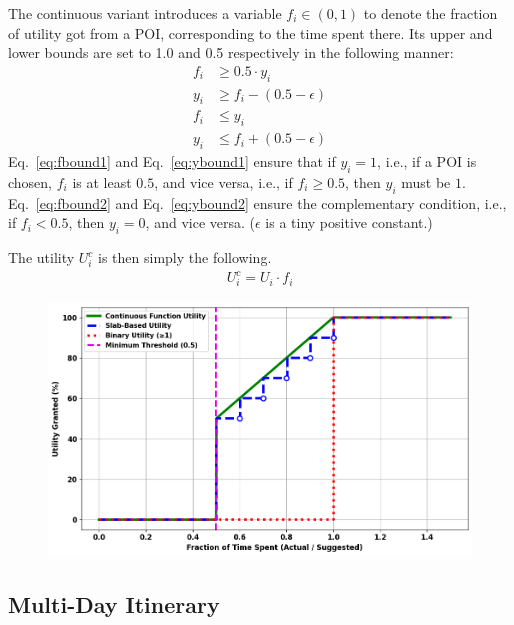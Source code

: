 The continuous variant introduces a variable $f_i \in (0,1)$ to denote the fraction of utility got from a POI, corresponding to the time spent there.
Its upper and lower bounds are set to 1.0 and 0.5 respectively in the following manner:
%
\begin{align}
	\label{eq:fbound1}
	f_i & \geq 0.5 \cdot y_i \\
	\label{eq:ybound1}
	y_i & \geq f_i - (0.5 - \epsilon) \\
    \label{eq:fbound2}
	f_i & \leq y_i \\
	\label{eq:ybound2}
    y_i & \leq f_i + (0.5 - \epsilon)
\end{align}
%
Eq.~\eqref{eq:fbound1} and Eq.~\eqref{eq:ybound1} ensure that if $y_i = 1$, i.e., if a POI is chosen, $f_i$ is at least $0.5$, and vice versa, i.e., if $f_i \geq 0.5$, then $y_i$ must be $1$. Eq.~\eqref{eq:fbound2} and
Eq.~\eqref{eq:ybound2} ensure the complementary condition, i.e., if $f_i
< 0.5$, then $y_i = 0$, and vice versa.  ($\epsilon$ is a
tiny positive constant.)

The utility $U^c_i$ is then simply the following.
%
\begin{align}
	\label{eq:continuous}
	U^c_i = U_i \cdot f_i
\end{align}

\begin{figure}[t]
\centering
\includegraphics[width=\columnwidth]{plots/UF_Combined.png}
\label{fig:utility}
\end{figure}

\subsection{Multi-Day Itinerary}
\label{sec:multiday}

